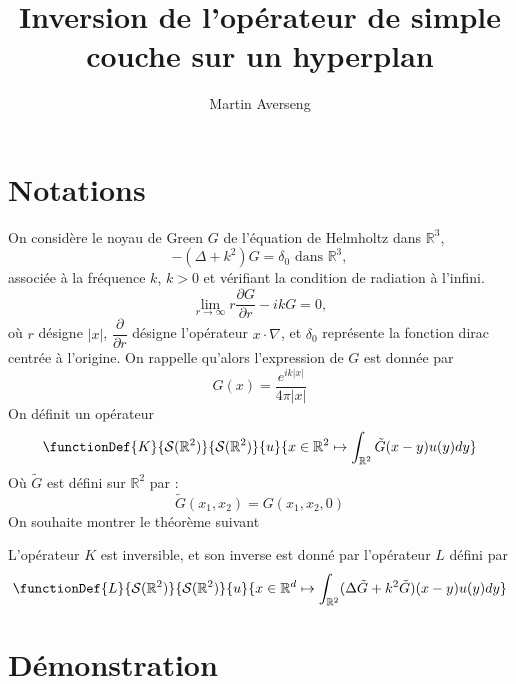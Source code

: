 \documentclass[11pt,a4paper]{article}
\title{Inversion de l'opérateur de simple couche sur un hyperplan}
\author{Martin Averseng}
\begin{document}
\maketitle

\section{Notations}

On considère le noyau de Green $G$ de l'équation de Helmholtz dans $\mathbb{R}^3$,
\[ -(\Delta+k^2)G = \delta_0 \text{ dans }\mathbb{R}^3,\]
associée à la fréquence $k$, $k > 0$ et vérifiant la condition de radiation à l'infini.
\[\lim_{r \to \infty} r\dfrac{\partial G}{\partial r} - ik G = 0,\]
où $r$ désigne $|x|$, $\dfrac{\partial}{\partial r}$ désigne l'opérateur $x\cdot \nabla$, et $\delta_0$ représente la fonction dirac centrée à l'origine. On rappelle qu'alors l'expression de $G$ est donnée par 
\[ G(x) = \dfrac{e^{ik|x|}}{4\pi|x|}\]
On définit un opérateur \[\functionDef{K}{\mathcal{S}(\mathbb{R}^{2})}{\mathcal{S}(\mathbb{R}^{2})}{u}{ x \in \mathbb{R}^2 \mapsto\int_{\mathbb{R}^{2}}\tilde{G}(x-y)u(y)dy}\]
Où $\tilde{G}$ est défini sur $\mathbb{R}^{2}$ par :
\[ \tilde{G}(x_1,x_2) = G(x_1,x_2,0)\]
On souhaite montrer le théorème suivant 
\begin{The} L'opérateur $K$ est inversible, et son inverse est donné par l'opérateur $L$ défini par 
\[ \functionDef{L}{\mathcal{S}(\mathbb{R}^{2})}{\mathcal{S}(\mathbb{R}^{2})}{u}{x \in \mathbb{R}^d \mapsto\int_{\mathbb{R}^{2}}(\Delta\tilde{G}+k^2\tilde{G})(x-y)u(y)dy}\]
\end{The}

\section{Démonstration}
\end{document}
